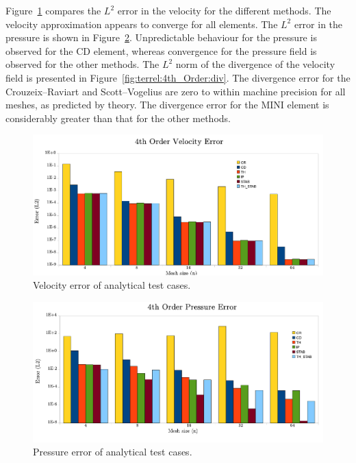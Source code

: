 Figure~\ref{fig:terrel:4th_Order:vel} compares the $L^{2}$ error in
the velocity for the different methods. The velocity approximation
appears to converge for all elements.  The $L^{2}$ error in the pressure
is shown in Figure~\ref{fig:terrel:4th_Order:press}.  Unpredictable
behaviour for the pressure is observed for the CD element, whereas
convergence for the pressure field is observed for the other methods.
The $L^{2}$ norm of the divergence of the velocity field is presented
in Figure~\ref{fig:terrel:4th_Order:div}.  The divergence error for
the Crouzeix--Raviart and Scott--Vogelius are zero to within machine
precision for all meshes, as predicted by theory. The divergence error
for the MINI element is considerably greater than that for the other methods.

\begin{figure}
  \center\includegraphics[width=\largefig]{chapters/terrel/pdf/vel_4.pdf}
  \caption{Velocity error of analytical test cases.}
    \label{fig:terrel:4th_Order:vel}
\end{figure}

\begin{figure}
  \center \includegraphics[width=\largefig]{chapters/terrel/pdf/press_4.pdf}
  \caption{Pressure error of analytical test cases.}
  \label{fig:terrel:4th_Order:press}
\end{figure}

